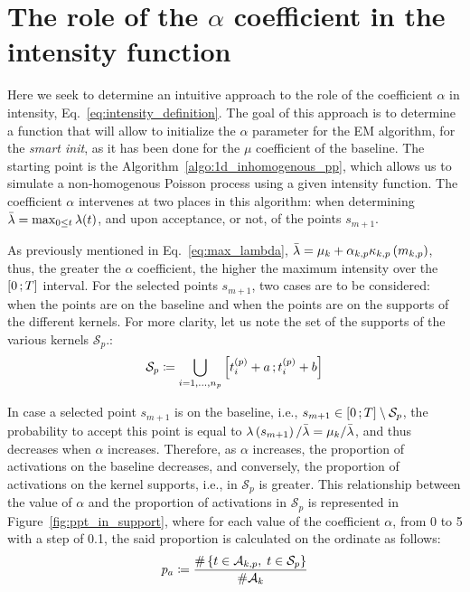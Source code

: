 \section{The role of the \texorpdfstring{$\alpha$}{TEXT} coefficient in the intensity function}\label{app:role_alpha_coef}

Here we seek to determine an intuitive approach to the role of the coefficient $\alpha$ in intensity, Eq.~\eqref{eq:intensity_definition}.
The goal of this approach is to determine a function that will allow to initialize the $\alpha$ parameter for the EM algorithm, for the \textit{smart init}, as it has been done for the $\mu$ coefficient of the baseline.
The starting point is the Algorithm~\ref{algo:1d_inhomogenous_pp}, which allows us to simulate a non-homogenous Poisson process using a given intensity function.
The coefficient $\alpha$ intervenes at two places in this algorithm: when determining $\Bar{\lambda} = \max_{0 \leq t} \lambda(t)$, and upon acceptance, or not, of the points $s_{m+1}$.

As previously mentioned in Eq.~\eqref{eq:max_lambda}, $\Bar{\lambda} = \mu_k + \alpha_{k,p}\kappa_{k,p}\left( m_{k,p} \right)$, thus, the greater the $\alpha$ coefficient, the higher the maximum intensity over the $\left[ 0 \, ; T \right]$ interval.
For the selected points $s_{m+1}$, two cases are to be considered: when the points are on the baseline and when the points are on the supports of the different kernels.
For more clarity, let us note the set of the supports of the various kernels $\mathcal{S}_{p}$.:
\begin{equation}
    \mathcal{S}_{p} \coloneqq \bigcup_{i = 1,\dots,n_p} \left[ t^{(p)}_i + a \, ; t^{(p)}_i + b \right]
\end{equation}

In case a selected point $s_{m+1}$ is on the baseline, i.e., $s_{m+1} \in \left[ 0 \, ; T \right] \setminus \mathcal{S}_{p}$, the probability to accept this point is equal to $\lambda\left( s_{m+1} \right) / \Bar{\lambda} = \mu_k / \Bar{\lambda}$, and thus decreases when $\alpha$ increases.
Therefore, as $\alpha$ increases, the proportion of activations on the baseline decreases, and conversely, the proportion of activations on the kernel supports, i.e., in $\mathcal{S}_{p}$ is greater.
This relationship between the value of $\alpha$ and the proportion of activations in $\mathcal{S}_{p}$ is represented in Figure~\ref{fig:ppt_in_support}, where for each value of the coefficient $\alpha$, from 0 to 5 with a step of 0.1, the said proportion is calculated on the ordinate as follows:
\begin{equation}
    p_a \coloneqq \frac{\#\left\lbrace t\in\mathcal{A}_{k,p},\; t\in\mathcal{S}_{p} \right\rbrace}{\# \mathcal{A}_k}
\end{equation}

